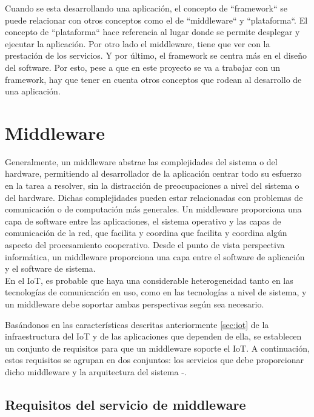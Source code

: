 \newpage

Cuando se esta desarrollando una aplicación, el concepto de ``framework`` se puede relacionar con otros conceptos como el de ``middleware`` y ``plataforma``. El concepto de ``plataforma`` hace referencia al lugar donde se permite desplegar y ejecutar la aplicación. Por otro lado el middleware, tiene que ver con la prestación de los servicios. Y por último, el framework se centra más en el diseño del software. Por esto, pese a que en este proyecto se va a trabajar con un framework, hay que tener en cuenta otros conceptos que rodean al desarrollo de una aplicación. \cite{nakhuva2015study}

\section{Middleware} \label{sec:middleware}

Generalmente, un middleware abstrae las complejidades del sistema o del hardware, permitiendo al desarrollador de la aplicación centrar todo su esfuerzo en la tarea a resolver, sin la distracción de preocupaciones a nivel del sistema o del hardware. Dichas complejidades pueden estar relacionadas con problemas de comunicación o de computación más generales. Un middleware proporciona una capa de software entre las aplicaciones, el sistema operativo y las capas de comunicación de la red, que facilita y coordina que facilita y coordina algún aspecto del procesamiento cooperativo. Desde el punto de vista perspectiva informática, un middleware proporciona una capa entre el software de aplicación y el software de sistema.\\

En el IoT, es probable que haya una considerable heterogeneidad tanto en las tecnologías de comunicación en uso, como en las tecnologías a nivel de sistema, y un middleware debe soportar ambas perspectivas según sea necesario. 

Basándonos en las características descritas anteriormente \ref{sec:iot} de la infraestructura del IoT y de las aplicaciones que dependen de ella, se establecen un conjunto de requisitos para que un middleware soporte el IoT. A continuación, estos requisitos se agrupan en dos conjuntos: los servicios que debe proporcionar dicho middleware y la arquitectura del sistema \cite{7322178}-\cite{7582463}.

\subsection{Requisitos del servicio de middleware}


